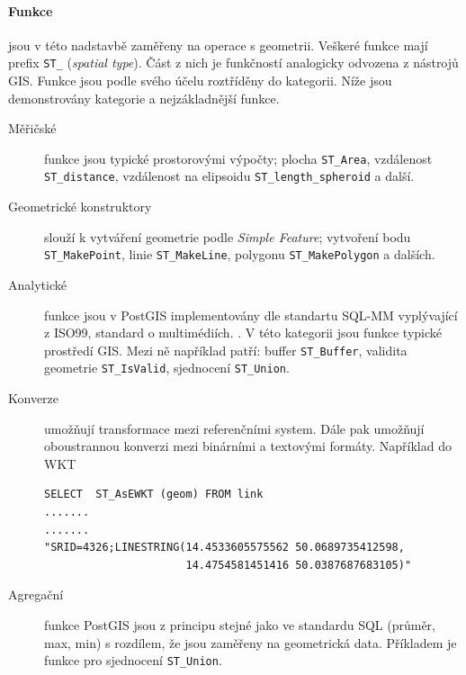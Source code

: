\documentclass[a4paper,12pt,oneside]{report}
\begin{document}
\paragraph*{Funkce} jsou  v této nadstavbě zaměřeny na operace s geometrii. Veškeré funkce mají prefix \texttt{ST\_} (\textit{spatial type}). Část z nich je funkčností analogicky odvozena z nástrojů GIS. Funkce jsou podle svého účelu roztříděny do kategorii. Níže jsou demonstrovány  kategorie a nejzákladnější  funkce.
\begin{description}
\item[Měřičské] funkce jsou typické prostorovými výpočty; plocha \texttt{ST\_Area}, vzdálenost \texttt{ST\_distance}, vzdálenost na elipsoidu \texttt{ST\_length\_spheroid} a další. 

\item[Geometrické konstruktory] slouží k vytváření geometrie podle \textit{Simple Feature}; vytvoření bodu \texttt{ST\_MakePoint}, linie \texttt{ST\_MakeLine}, polygonu \texttt{ST\_MakePolygon} a dalších.

\item[Analytické] funkce jsou v PostGIS implementovány dle standartu SQL-MM  vyplývající z ISO99, standard o multimédiích. 				\cite{sqlmm}. V této kategorii jsou funkce typické prostředí GIS. Mezi ně například patří: buffer \texttt{ST\_Buffer}, validita geometrie \texttt{ST\_IsValid}, sjednocení \texttt{ST\_Union}.

\item[Konverze] umožňují transformace mezi referenčními system. Dále pak umožňují oboustrannou konverzi mezi binárními a textovými formáty. Například do \acs{WKT} 

\begin{verbatim}
SELECT  ST_AsEWKT (geom) FROM link
.......
.......
"SRID=4326;LINESTRING(14.4533605575562 50.0689735412598,
                      14.4754581451416 50.0387687683105)"
\end{verbatim}

\item[Agregační] funkce PostGIS jsou z principu  stejné jako ve standardu SQL (průměr, max, min) s rozdílem, že jsou zaměřeny na geometrická data. Příkladem je funkce pro sjednocení \texttt{ST\_Union}.
\end{description}




\newpage
\setcounter{footnote}{1}
\end{document}

